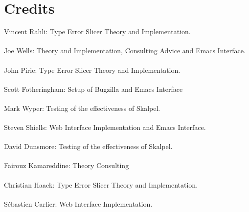 \documentclass{report}
\begin{document}
\chapter {Credits}
Vincent Rahli: Type Error Slicer Theory and Implementation.\\\\
Joe Wells: Theory and Implementation, Consulting Advice and Emacs
Interface.\\\\
John Pirie: Type Error Slicer Theory and Implementation.\\\\
Scott Fotheringham: Setup of Bugzilla and Emacs Interface\\\\
Mark Wyper: Testing of the effectiveness of Skalpel.\\\\
Steven Shiells: Web Interface Implementation and Emacs Interface.\\\\
David Dunsmore: Testing of the effectiveness of Skalpel.\\\\
Fairouz Kamareddine: Theory Consulting\\\\
Christian Haack: Type Error Slicer Theory and Implementation.\\\\
S\'ebastien Carlier: Web Interface Implementation.
\end{document}
